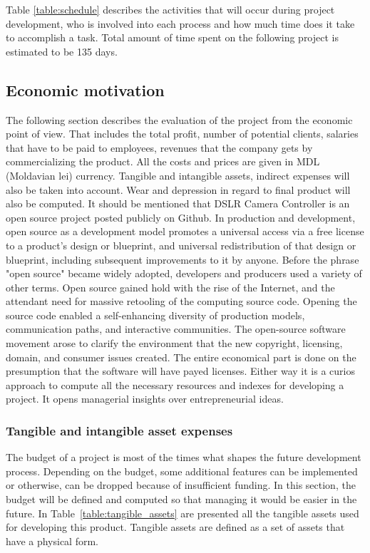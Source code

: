 Table \ref{table:schedule} describes the activities that will occur during project development, who is involved into each process and how much time does it take to accomplish a task. Total amount of time spent on the following project is estimated to be 135 days.

\subsection{Economic motivation}
The following section describes the evaluation of the project from the economic point of view. That includes the total profit, number of potential clients, salaries that have to be paid to employees, revenues that the company gets by commercializing the product. All the costs and prices are given in MDL (Moldavian lei) currency. Tangible and intangible assets, indirect expenses will also be taken into account. Wear and depression in regard to final product will also be computed. It should be mentioned that DSLR Camera Controller is an open source project posted publicly on Github. In production and development, open source as a development model promotes a universal access via a free license to a product's design or blueprint, and universal redistribution of that design or blueprint, including subsequent improvements to it by anyone. Before the phrase "open source" became widely adopted, developers and producers used a variety of other terms. Open source gained hold with the rise of the Internet, and the attendant need for massive retooling of the computing source code. Opening the source code enabled a self-enhancing diversity of production models, communication paths, and interactive communities. The open-source software movement arose to clarify the environment that the new copyright, licensing, domain, and consumer issues created. The entire economical part is done on the presumption that the software will have payed licenses. Either way it is a curios approach to compute all the necessary resources and indexes for developing a project. It opens managerial insights over entrepreneurial ideas.

\subsubsection{Tangible and intangible asset expenses}
The budget of a project is most of the times what shapes the future development process. Depending on the budget, some additional features can be implemented or otherwise, can be dropped because of insufficient funding. In this section, the budget will be defined and computed so that managing it would be easier in the future. In \mbox{Table \ref{table:tangible_assets}} are presented all the tangible assets used for developing this product. Tangible assets are defined as a set of assets that have a physical form.

